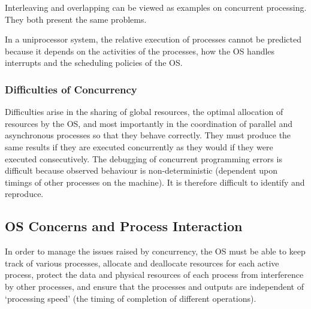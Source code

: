 Interleaving and overlapping can be viewed as examples on concurrent processing.
They both present the same problems.

In a uniprocessor system, the relative execution of processes cannot be predicted because it depends on the activities of the processes, how the OS handles interrupts and the scheduling policies of the OS.

\subsubsection{Difficulties of Concurrency}

Difficulties arise in the sharing of global resources, the optimal allocation of resources by the OS, and most importantly in the coordination of parallel and asynchronous processes so that they behave correctly.
They must produce the same results if they are executed concurrently as they would if they were executed consecutively.
The debugging of concurrent programming errors is difficult because observed behaviour is non-deterministic (dependent upon timings of other processes on the machine).
It is therefore difficult to identify and reproduce.

\subsection{OS Concerns and Process Interaction}

In order to manage the issues raised by concurrency, the OS must be able to keep track of various processes, allocate and deallocate resources for each active process, protect the data and physical resources of each process from interference by other processes, and ensure that the processes and outputs are independent of `processing speed' (the timing of completion of different operations).

